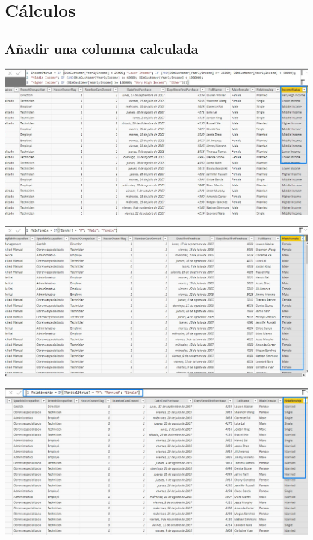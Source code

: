 \section{ Cálculos}
\subsection{ Añadir una columna calculada}


\begin{center}
\includegraphics[width=\columnwidth]{images/task3/task3-02}\newline
\end{center}

\begin{center}
\includegraphics[width=\columnwidth]{images/task3/task3-05}\newline
\end{center}

\begin{center}
\includegraphics[width=\columnwidth]{images/task3/task3-06}\newline
\end{center}

